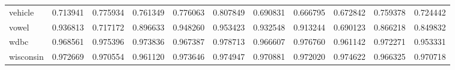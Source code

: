\begin{tabular}{lrrrrrrrrrr}
vehicle         &   0.713941 &  0.775934 &  0.761349 &  0.776063 &  0.807849 &  0.690831 &  0.666795 &  0.672842 &  0.759378 &  0.724442 \\
vowel           &   0.936813 &  0.717172 &  0.896633 &  0.948260 &  0.953423 &  0.932548 &  0.913244 &  0.690123 &  0.866218 &  0.849832 \\
wdbc            &   0.968561 &  0.975396 &  0.973836 &  0.967387 &  0.978713 &  0.966607 &  0.976760 &  0.961142 &  0.972271 &  0.953331 \\
wisconsin       &   0.972669 &  0.970554 &  0.961120 &  0.973646 &  0.974947 &  0.970881 &  0.972020 &  0.974622 &  0.966325 &  0.970718 \\
\bottomrule
\end{tabular}
